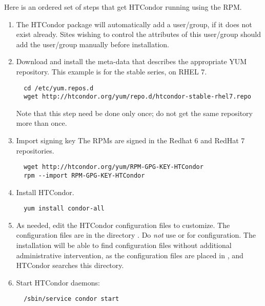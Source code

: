 Here is an ordered set of steps that get HTCondor running using the RPM.
\begin{enumerate}
\item The HTCondor package will automatically add a  user/group,
if it does not exist already.
Sites wishing to control the attributes of this user/group 
should add the  user/group manually before installation.

\item Download and install the meta-data that describes 
the appropriate YUM repository. 
This example is for the stable series, on RHEL 7.
\footnotesize
\begin{verbatim}
  cd /etc/yum.repos.d
  wget http://htcondor.org/yum/repo.d/htcondor-stable-rhel7.repo
\end{verbatim}
\normalsize
Note that this step need be done only once;
do not get the same repository more than once.

\item Import signing key
The RPMs are signed in the Redhat 6 and RedHat 7 repositories. 
\begin{verbatim}
  wget http://htcondor.org/yum/RPM-GPG-KEY-HTCondor
  rpm --import RPM-GPG-KEY-HTCondor
\end{verbatim}

\item Install HTCondor.
\begin{verbatim}
  yum install condor-all
\end{verbatim}

\item As needed, edit the HTCondor configuration files to customize.
The configuration files are in the directory  .
Do \emph{not} use  or  for configuration.
The installation will be able to find configuration files without
additional administrative intervention,
as the configuration files are placed in ,
and HTCondor searches this directory.

\item Start HTCondor daemons:
\begin{verbatim}
  /sbin/service condor start
\end{verbatim}

\end{enumerate}



